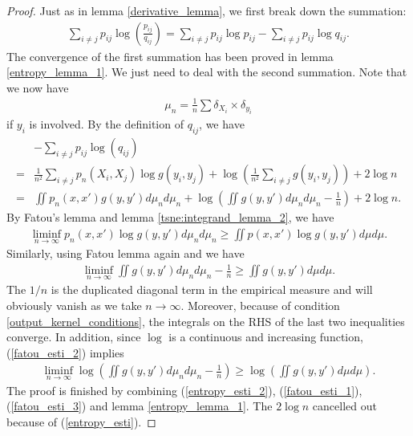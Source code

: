 \begin{proof}
    Just as in lemma \ref{derivative_lemma}, we first break down the summation:
    \begin{align}
        \sum_{i \neq j} p_{ij} \log \left(\frac{p_{ij}}{q_{ij}}\right) = \sum_{i \neq j} p_{ij} \log p_{ij} - \sum_{i \neq j} p_{ij} \log q_{ij}.
    \end{align}
    The convergence of the first summation has been proved in lemma \ref{entropy_lemma_1}. We just need to deal with the second summation. Note that we now have
    \begin{align}
        \mu_n = \frac{1}{n} \sum \delta_{X_i} \times \delta_{y_i}
    \end{align}
    if $y_i$ is involved. By the definition of $q_{ij}$, we have
    \begin{align} \label{entropy_esti_2}
          & -\sum_{i \neq j}p_{ij} \log(q_{ij}) \nonumber                                                                                             \\
        = & \frac{1}{n^2}\sum_{i \neq j} p_n(X_i,X_j) \log g(y_i,y_j) + \log \left(\frac{1}{n^2}\sum_{i \neq j} g(y_i,y_j)\right) +2 \log n \nonumber \\
        = & \iint p_n(x,x')g(y,y')d\mu_n d\mu_n + \log \left(\iint g(y,y')d\mu_n d\mu_n - \frac{1}{n}\right)+2\log n.
    \end{align}
    By Fatou's lemma and lemma \ref{tsne:integrand_lemma_2}, we have
    \begin{align} \label{fatou_esti_1}
        \liminf_{n \to \infty} p_n(x,x')\log g(y,y') d\mu_n d\mu_n \geq  \iint p(x,x')\log g(y,y') d\mu d\mu.
    \end{align}
    Similarly, using Fatou lemma again and we have
    \begin{align} \label{fatou_esti_2}
        \liminf_{n \to \infty} \iint g(y,y') d\mu_n d\mu_n - \frac{1}{n} \geq \iint g(y,y')d\mu d\mu.
    \end{align}
    The $1/n$ is the duplicated diagonal term in the empirical measure and will obviously vanish as we take $n \to \infty$. Moreover, because of condition \ref{output_kernel_conditions}, the integrals on the RHS of the last two inequalities converge. In addition, since $\log$ is a continuous and increasing function, (\ref{fatou_esti_2}) implies
    \begin{align} \label{fatou_esti_3}
        \liminf_{n \to \infty} \log \left(\iint g(y,y') d\mu_n d\mu_n - \frac{1}{n}\right) \geq \log \left(\iint g(y,y')d\mu d\mu \right).
    \end{align}
    The proof is finished by combining (\ref{entropy_esti_2}), (\ref{fatou_esti_1}), (\ref{fatou_esti_3}) and lemma \ref{entropy_lemma_1}. The $2 \log n$ cancelled out because of (\ref{entropy_esti}).
\end{proof}
